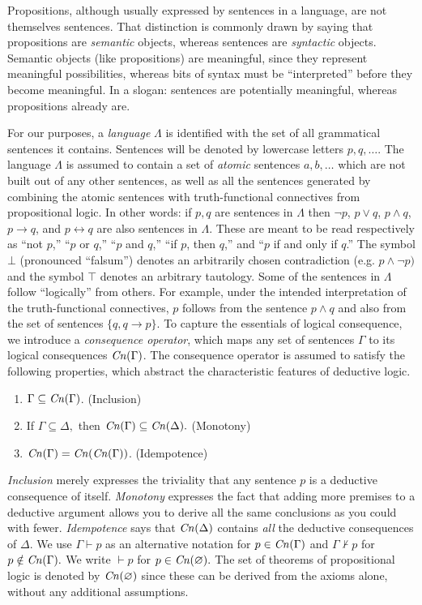 Propositions, although usually expressed by sentences in a language, are not
themselves sentences. That distinction is commonly drawn by saying that
propositions are {\em semantic} objects, whereas sentences are {\em syntactic}
objects. Semantic objects (like propositions) are meaningful, since they
represent meaningful possibilities, whereas bits of syntax must be
``interpreted'' before they become meaningful. In a slogan: sentences are
potentially meaningful, whereas propositions already are.

For our purposes, a {\em language} $\Lambda$ is identified with the set of all
grammatical sentences it contains. Sentences will be denoted by lowercase
letters $p, q, \ldots$. The language $\Lambda$ is assumed to contain a set of
{\em atomic} sentences $a,b, \ldots$ which are not built out of any other
sentences, as well as all the sentences generated by combining the atomic
sentences with  truth-functional connectives from propositional logic. In other
words: if $p,q$ are sentences in $\Lambda$ then $\neg p$, $p\vee q$, $p\wedge
q$, $p\rightarrow q$, and  $p \leftrightarrow q$ are also sentences in
$\Lambda$. These are meant to be read respectively as ``not $p$,'' ``$p$ or
$q$,'' ``$p$ and $q$,'' ``if $p$, then $q$,'' and ``$p$ if and only if $q$.''
The symbol $\bot$ (pronounced ``falsum'') denotes an arbitrarily chosen
contradiction (e.g. $p\wedge \neg p)$ and the symbol $\top$ denotes an arbitrary
tautology. Some of the sentences in $\Lambda$ follow ``logically'' from others.
For example, under the intended interpretation of the truth-functional
connectives, $p$ follows from the sentence $p\wedge q$ and also from the set of
sentences $\{q, q\rightarrow p \}$. To capture the essentials of logical
consequence, we introduce a {\em consequence operator}, which maps any set of
sentences $\Gamma$ to its logical consequences $\text{\textit{Cn}}(\Gamma)$. The consequence
operator is assumed to satisfy the following properties, which abstract the
characteristic features of deductive logic.
\begin{enumerate}
\item[] $\Gamma \subseteq \text{\textit{Cn}}(\Gamma)$. \hfill (Inclusion)
\item[] If $\Gamma\subseteq \Delta,$ then $\text{\textit{Cn}}(\Gamma) \subseteq \text{\textit{Cn}}(\Delta).$
\hfill (Monotony)
\item[] $\text{\textit{Cn}}(\Gamma)=\text{\textit{Cn}}(\text{\textit{Cn}}(\Gamma))$. \hfill (Idempotence)
\end{enumerate}
{\em Inclusion} merely expresses the triviality that any sentence  $p$ is a
deductive consequence of itself. {\em Monotony} expresses the fact that adding
more premises to a deductive argument allows you to derive all the same
conclusions as you could with fewer. {\em Idempotence} says that $\text{\textit{Cn}}(\Delta)$
contains {\em all} the deductive consequences of $\Delta$. We use $\Gamma \vdash
p$ as an alternative notation for $p \in \text{\textit{Cn}}(\Gamma)$ and $\Gamma \nvdash p$ for
$p\notin \text{\textit{Cn}}(\Gamma).$ We write $\vdash p$ for $p\in \text{\textit{Cn}}(\varnothing).$ The set
of theorems of propositional logic is denoted by $\text{\textit{Cn}}(\varnothing)$ since these
can be derived from the axioms alone, without any additional assumptions.

